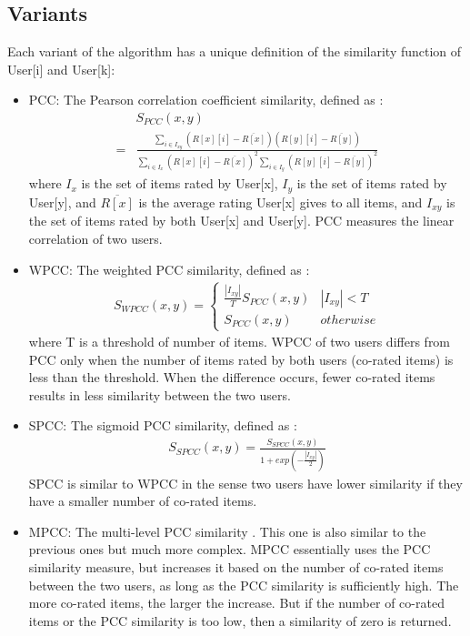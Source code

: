 \documentclass[12pt]{WSUThesis}
\theoremstyle{definition}
\begin{document}
\subsection{Variants}
Each variant of the algorithm has a unique definition of the similarity 
function of User[i] and User[k]:
\begin{itemize}
	\item PCC: The Pearson correlation coefficient similarity, defined as 
	\cite{resnick1994grouplens}:
	\begin{align*}
	& S_{PCC}(x, y) \\
	=& \frac{\sum_{i \in I_{xy}}(R[x][i] - \overline{R[x]})(R[y][i] - 
		\overline{R[y]})}{\sum_{i \in I_{x}}(R[x][i] - \overline{R[x]})^2 
		\sum_{i 
			\in I_{y}}(R[y][i] - \overline{R[y]})^2 }
	\end{align*}
	where $ I_{x} $ is the set of items rated by User[x],
	$ I_{y} $ is the set of items rated by User[y],
	and	$ \overline{R[x]} $ is the average rating User[x] gives to all items,
	and $ I_{xy} $ is the set of items rated by both User[x] and User[y].
	PCC measures the linear correlation of two users.
	\item WPCC: The weighted PCC similarity, defined as 
	\cite{herlocker1999algorithmic}:
	\begin{align*}
	S_{WPCC}(x, y)=
	\begin{cases}
	\frac{|I_{xy}|}{T} S_{PCC}(x, y) & |I_{xy}| < T \\
	S_{PCC}(x, y) & otherwise
	\end{cases}
	\end{align*}
	where T is a threshold of number of items. 
	WPCC of two users differs from PCC only when the number of items rated by 
	both users (co-rated items) is less than the threshold. 
	When the difference occurs, fewer co-rated items results in less similarity 
	between the two users.
	\item SPCC: The sigmoid PCC similarity, defined as 	
	\cite{jamali2009trustwalker}:
	\begin{align*}
	S_{SPCC} (x, y)
	= \frac{S_{SPCC}(x, y)}{1 + exp(-\frac{|I_{xy}|}{2})}
	\end{align*}
	SPCC is similar to WPCC in the sense two users have lower similarity 
	if they have a smaller number of co-rated items.
	\item MPCC: The multi-level PCC similarity \cite{polatidis2016multi}. 
	This one is also similar to the previous ones but much more complex.
	MPCC essentially uses the PCC similarity measure, but increases it 
	based on the number of co-rated items between the two users,
	as long as the PCC similarity is sufficiently high.
	The more co-rated items, the larger the increase.
	But if the number of co-rated items or the PCC similarity is too low,
	then a similarity of zero is returned.
\end{itemize}
\end{document}
